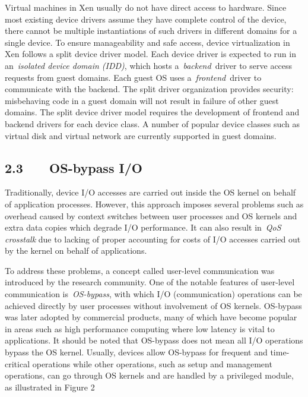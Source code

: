 \documentclass[12pt]{article}
\begin{document}
{\fontsize{13pt}{15.6pt}\selectfont Virtual machines in Xen usually do not have direct access to hardware. Since most existing device drivers assume they have complete control of the device, there cannot be multiple instantiations of such drivers in different domains for a single device. To ensure manageability and safe access, device virtualization in Xen follows a split device driver model. Each device driver is expected to run in an \textit{isolated device domain (IDD)}, which hosts a \textit{backend} driver to serve access requests from guest domains. Each guest OS uses a \textit{frontend} driver to communicate with the backend. The split driver organization provides security: misbehaving code in a guest domain will not result in failure of other guest domains. The split device driver model requires the development of frontend and backend drivers for each device class. A number of popular device classes such as virtual disk and virtual network are currently supported in guest domains.\par}\par

\setlength{\parskip}{8.04pt}
\subsection*{2.3 \ \ \  OS-bypass I/O}
\setlength{\parskip}{0.0pt}
{\fontsize{13pt}{15.6pt}\selectfont Traditionally, device I/O accesses are carried out inside the OS kernel on behalf of application processes. However, this approach imposes several problems such as overhead caused by context switches between user processes and OS kernels and extra data copies which degrade I/O performance. It can also result in \textit{QoS crosstalk} due to lacking of proper accounting for costs of I/O accesses carried out by the kernel on behalf of applications.\par}\par

\setlength{\parskip}{5.04pt}
{\fontsize{13pt}{15.6pt}\selectfont To address these problems, a concept called user-level communication was introduced by the research community. One of the notable features of user-level communication is \textit{OS-bypass}, with which I/O (communication) operations can be achieved directly by user processes without involvement of OS kernels. OS-bypass was later adopted by commercial products, many of which have become popular in areas such as high performance computing where low latency is vital to applications. It should be noted that OS-bypass does not mean all I/O operations bypass the OS kernel. Usually, devices allow OS-bypass for frequent and time-critical operations while other operations, such as setup and management operations, can go through OS kernels and are handled by a privileged module, as illustrated in Figure 2 \par}\par
\end{document}
